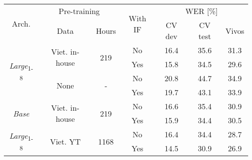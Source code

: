 \begin{table}[!ht]
\captionsetup{font=Large}
\centering
\begin{adjustbox}{width=0.8\columnwidth,center}
\begin{tabular}{|c|c|c|c|c|c|c|} 
\hline
\multirow{2}{*}{Arch.}             & \multicolumn{2}{c|}{Pre-training}                       & \multirow{2}{*}{With IF} & \multicolumn{3}{c|}{WER [\%]}  \\ 
\cline{2-3}\cline{5-7}
                                   & Data                            & Hours                 &                          & CV dev & CV test & Vivos       \\ 
\hline
\multirow{4}{*}{\textit{Large}\textsubscript{1-8}} & \multirow{2}{*}{Viet. in-house} & \multirow{2}{*}{219}  & No                       & 16.4   & 35.6    & 31.3        \\ 
\cline{4-7}
                                   &                                 &                       & Yes                      & 15.8   & 34.5    & 29.6        \\ 
\cline{2-7}
                                   & \multirow{2}{*}{None}           & \multirow{2}{*}{-}    & No                       & 20.8   & 44.7    & 34.9        \\ 
\cline{4-7}
                                   &                                 &                       & Yes                      & 19.7   & 43.1    & 33.9        \\ 
\hline
\multirow{2}{*}{\textit{Base}}     & \multirow{2}{*}{Viet. in-house} & \multirow{2}{*}{219}  & No                       & 16.6   & 35.4    & 30.9        \\ 
\cline{4-7}
                                   &                                 &                       & Yes                      & 15.9   & 34.4    & 30.5        \\ 
\hline
\multirow{2}{*}{\textit{Large}\textsubscript{1-8}} & \multirow{2}{*}{Viet. YT}       & \multirow{2}{*}{1168} & No                       & 16.4   & 34.4    & 28.7        \\ 
\cline{4-7}
                                   &                                 &                       & Yes                      & 14.5   & 30.9    & 26.9        \\
\hline
\end{tabular}
\end{adjustbox}
\caption{
    }
\label{table:if_loss_cvvivos_pos}
\end{table}